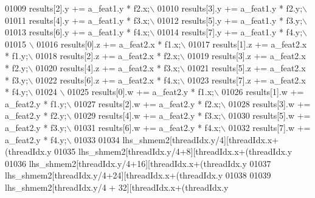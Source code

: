 \begin{DoxyCode}
01009 \textcolor{preprocessor}{      results[2].y += a\_feat1.y * f2.x;\(\backslash\)}
01010 \textcolor{preprocessor}{      results[3].y += a\_feat1.y * f2.y;\(\backslash\)}
01011 \textcolor{preprocessor}{      results[4].y += a\_feat1.y * f3.x;\(\backslash\)}
01012 \textcolor{preprocessor}{      results[5].y += a\_feat1.y * f3.y;\(\backslash\)}
01013 \textcolor{preprocessor}{      results[6].y += a\_feat1.y * f4.x;\(\backslash\)}
01014 \textcolor{preprocessor}{      results[7].y += a\_feat1.y * f4.y;\(\backslash\)}
01015 \textcolor{preprocessor}{\(\backslash\)}
01016 \textcolor{preprocessor}{      results[0].z += a\_feat2.x * f1.x;\(\backslash\)}
01017 \textcolor{preprocessor}{      results[1].z += a\_feat2.x * f1.y;\(\backslash\)}
01018 \textcolor{preprocessor}{      results[2].z += a\_feat2.x * f2.x;\(\backslash\)}
01019 \textcolor{preprocessor}{      results[3].z += a\_feat2.x * f2.y;\(\backslash\)}
01020 \textcolor{preprocessor}{      results[4].z += a\_feat2.x * f3.x;\(\backslash\)}
01021 \textcolor{preprocessor}{      results[5].z += a\_feat2.x * f3.y;\(\backslash\)}
01022 \textcolor{preprocessor}{      results[6].z += a\_feat2.x * f4.x;\(\backslash\)}
01023 \textcolor{preprocessor}{      results[7].z += a\_feat2.x * f4.y;\(\backslash\)}
01024 \textcolor{preprocessor}{\(\backslash\)}
01025 \textcolor{preprocessor}{      results[0].w += a\_feat2.y * f1.x;\(\backslash\)}
01026 \textcolor{preprocessor}{      results[1].w += a\_feat2.y * f1.y;\(\backslash\)}
01027 \textcolor{preprocessor}{      results[2].w += a\_feat2.y * f2.x;\(\backslash\)}
01028 \textcolor{preprocessor}{      results[3].w += a\_feat2.y * f2.y;\(\backslash\)}
01029 \textcolor{preprocessor}{      results[4].w += a\_feat2.y * f3.x;\(\backslash\)}
01030 \textcolor{preprocessor}{      results[5].w += a\_feat2.y * f3.y;\(\backslash\)}
01031 \textcolor{preprocessor}{      results[6].w += a\_feat2.y * f4.x;\(\backslash\)}
01032 \textcolor{preprocessor}{      results[7].w += a\_feat2.y * f4.y;\(\backslash\)}
01033 \textcolor{preprocessor}{}
01034     lhs\_shmem2[threadIdx.y/4][threadIdx.x+(threadIdx.y%
01035     lhs\_shmem2[threadIdx.y/4+8][threadIdx.x+(threadIdx.y%
01036     lhs\_shmem2[threadIdx.y/4+16][threadIdx.x+(threadIdx.y%
01037     lhs\_shmem2[threadIdx.y/4+24][threadIdx.x+(threadIdx.y%
01038 
01039     lhs\_shmem2[threadIdx.y/4 + 32][threadIdx.x+(threadIdx.y%

\end{DoxyCode}
